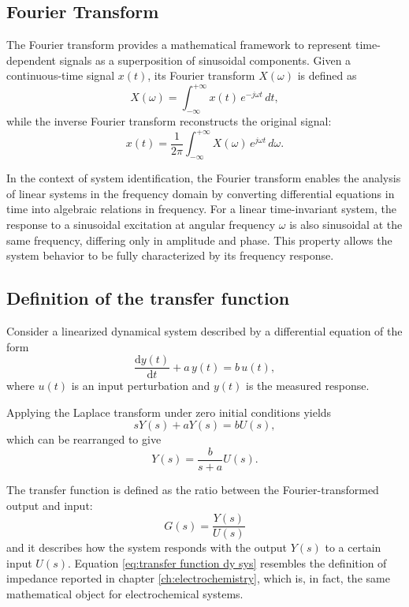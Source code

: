 \subsection{Fourier Transform}

The Fourier transform provides a mathematical framework to represent time-dependent signals as a superposition of sinusoidal components.
Given a continuous-time signal \( x(t) \), its Fourier transform \( X(\omega) \) is defined as
\begin{equation}
X(\omega) =
\int_{-\infty}^{+\infty}
x(t)\, e^{-j\omega t}\, dt,
\end{equation}
while the inverse Fourier transform reconstructs the original signal:
\begin{equation}
x(t) =
\frac{1}{2\pi}
\int_{-\infty}^{+\infty}
X(\omega)\, e^{j\omega t}\, d\omega.
\end{equation}

In the context of system identification, the Fourier transform enables the analysis of linear systems in the frequency domain by converting differential equations in time into algebraic relations in frequency.
For a linear time-invariant system, the response to a sinusoidal excitation at angular frequency \( \omega \) is also sinusoidal at the same frequency, differing only in amplitude and phase.
This property allows the system behavior to be fully characterized by its frequency response.

\subsection{Definition of the transfer function}
\label{sec:transfer function def diff equations}
Consider a linearized dynamical system described by a differential equation of the form
\begin{equation}
\frac{\mathrm{d}y(t)}{\mathrm{d}t} + a\,y(t) = b\,u(t),
\end{equation}
where \( u(t) \) is an input perturbation and \( y(t) \) is the measured response.

Applying the Laplace transform under zero initial conditions yields
\begin{equation}
s Y(s) + a Y(s) = b U(s),
\end{equation}
which can be rearranged to give
\begin{equation}
Y(s) = \frac{b}{s + a} U(s).
\end{equation}

The transfer function is defined as the ratio between the Fourier-transformed output and input:
\begin{equation}
G(s) = \frac{Y(s)}{U(s)}
\label{eq:transfer function dy sys}
\end{equation}
and it describes how the system responds with the output \( Y(s) \) to a certain input \( U(s) \).
Equation \ref{eq:transfer function dy sys} resembles the definition of impedance reported in chapter \ref{ch:electrochemistry}, which is, in fact, the same mathematical object for electrochemical systems.


